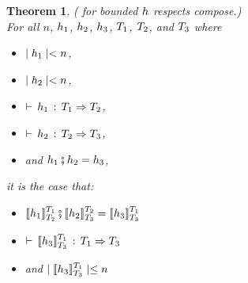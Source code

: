 \documentclass[acmtog, authorversion, acmlarge]{acmart}
\newtheorem{thm}{Theorem}
\begin{document}
\begin{thm}
  \label{thm:iso_cmp_n}
  ( for bounded $\HC$ respects compose.)\\
  For all $n$, $\HC_1$, $\HC_2$, $\HC_3$, $\T_1$, $\T_2$, and $\T_3$ where
  \begin{itemize}
    \item $\depth{\HC_1} < n$,
    \item $\depth{\HC_2} < n$,
    \item $\cwt{\HC_1}{\T_1}{\T_2}$,
    \item $\cwt{\HC_2}{\T_2}{\T_3}$,
    \item and $\cmp{\HC_1}{\HC_2} = \HC_3$,
  \end{itemize}
  it is the case that:
  \begin{itemize}
  \item $\cmp{\interp{\HC_1}{\T_1}{\T_2}}{\interp{\HC_2}{\T_2}{\T_3}}
    = \interp{\HC_3}{\T_1}{\T_3}$
  \item $\cwt{\interp{\HC_3}{\T_1}{\T_3}}{\T_1}{\T_3}$
  \item and $\depth{\interp{\HC_3}{\T_1}{\T_3}} \le n$
  \end{itemize}
\end{thm}
\end{document}
